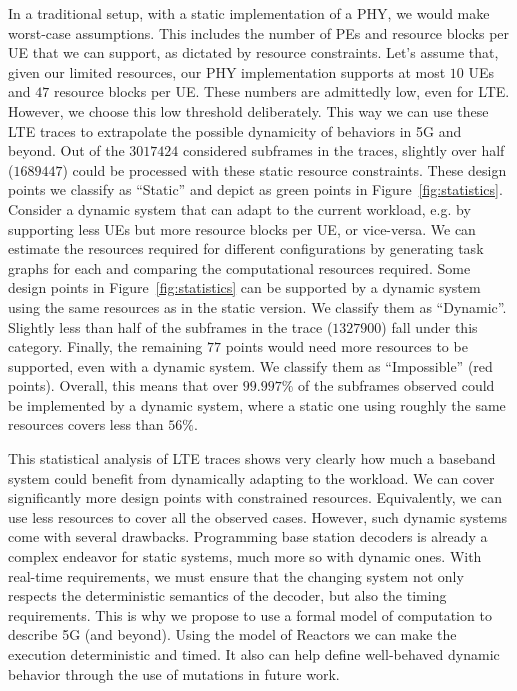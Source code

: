 In a traditional setup, with a static implementation of a \acs{PHY}, we would make worst-case assumptions.
This includes the number of \acp{PE} and resource blocks per \ac{UE} that we can support, as dictated by resource constraints.
Let's assume that, given our limited resources, our \acs{PHY} implementation supports at most $10$ \acp{UE} and $47$ resource blocks per \ac{UE}.
These numbers are admittedly low, even for \acs{LTE}.
However, we choose this low threshold deliberately.
This way we can use these \ac{LTE} traces to extrapolate the possible dynamicity of behaviors in 5G and beyond.
Out of the $3017424$ considered subframes in the traces, slightly over half ($1689447$) could be processed with these static resource constraints.
These design points we classify as ``Static'' and depict as green points in Figure~\ref{fig:statistics}.
Consider a dynamic system that can adapt to the current workload, e.g. by supporting less \acp{UE} but more resource blocks per \ac{UE}, or vice-versa.
We can estimate the resources required for different configurations by generating task graphs for each and comparing the computational resources required.
Some design points in Figure~\ref{fig:statistics} can be supported by a dynamic system using the same resources as in the static version.
We classify them as ``Dynamic''.
Slightly less than half of the subframes in the trace ($1327900$) fall under this category.
Finally, the remaining $77$ points would need more resources to be supported, even with a dynamic system.
We classify them as ``Impossible'' (red points).
Overall, this means that over $99.997\%$ of the subframes observed could be implemented by a dynamic system, where a static one using roughly the same resources covers less than $56\%$.

This statistical analysis of LTE traces shows very clearly how much a baseband system could benefit from dynamically adapting to the workload.
We can cover significantly more design points with constrained resources.
Equivalently, we can use less resources to cover all the observed cases.
However, such dynamic systems come with several drawbacks.
Programming base station decoders is already a complex endeavor for static systems, much more so with dynamic ones.
With real-time requirements, we must ensure that the changing system not only respects the deterministic semantics of the decoder, but also the timing requirements.
This is why we propose to use a formal model of computation to describe 5G (and beyond). Using the model of Reactors we can make the execution deterministic and timed.
It also can help define well-behaved dynamic behavior through the use of mutations in future work.

